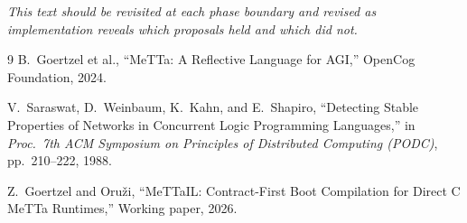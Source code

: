 \documentclass[11pt]{article}
\begin{document}
\emph{This text should be revisited at each phase boundary and
revised as implementation reveals which proposals held and which
did not.}


\begin{thebibliography}{9}
  B.~Goertzel et al.,
  ``MeTTa: A Reflective Language for AGI,''
  OpenCog Foundation, 2024.

  V.~Saraswat, D.~Weinbaum, K.~Kahn, and E.~Shapiro,
  ``Detecting Stable Properties of Networks in Concurrent Logic
  Programming Languages,''
  in \emph{Proc.\ 7th ACM Symposium on Principles of Distributed
  Computing (PODC)}, pp.~210--222, 1988.

  Z.~Goertzel and Oru\v{z}i,
  ``MeTTaIL: Contract-First Boot Compilation for Direct C MeTTa Runtimes,''
  Working paper, 2026.
\end{thebibliography}
\end{document}
